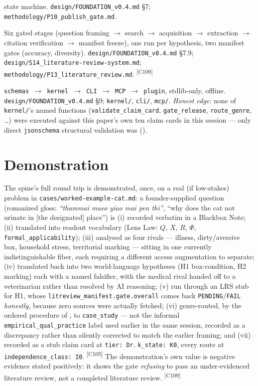 \documentclass[11pt]{article}
\newcommand{\claimref}[1]{\textsuperscript{[#1]}}
\begin{document}
\begin{description}[style=nextline,leftmargin=1.4em,font=\bfseries]
    state machine. \texttt{design/FOUNDATION\_v0.4.md} \S7; \texttt{methodology/P10\_publish\_gate.md}.
  \item[Literature Review System (LRS)] Six gated stages (question framing $\to$ search $\to$
    acquisition $\to$ extraction $\to$ citation verification $\to$ manifest freeze), one run per
    hypothesis, two manifest gates (accuracy, diversity). \texttt{design/FOUNDATION\_v0.4.md}
    \S7.9; \texttt{design/S14\_literature-review-system.md};
    \texttt{methodology/P13\_literature\_review.md}. \claimref{C109}
  \item[Callable layer] \texttt{schemas $\to$ kernel $\to$ CLI $\to$ MCP $\to$ plugin}, stdlib-only,
    offline. \texttt{design/FOUNDATION\_v0.4.md} \S9; \texttt{kernel/}, \texttt{cli/}, \texttt{mcp/}.
    \emph{Honest edge:} none of \texttt{kernel/}'s named functions (\texttt{validate\_claim\_card},
    \texttt{gate\_release}, \texttt{route\_genre}, \dots) were executed against this paper's own
    ten claim cards in this session --- only direct \texttt{jsonschema} structural validation was
    ().
\end{description}

\section{Demonstration}
\label{sec:demonstration}
The spine's full round trip is demonstrated, once, on a real (if low-stakes) problem in
\texttt{cases/worked-example-cat.md}: a founder-supplied question (romanized gloss: \emph{``thammai
maeo yiao mai pen thi''}, ``why does the cat not urinate in [the designated] place'') is (i)
recorded verbatim in a Blackbox Note; (ii) translated into readout vocabulary (Lens Law: $Q$, $X$,
$R$, $\Phi$, \texttt{formal\_applicability}); (iii) analysed as four rivals --- illness,
dirty/aversive box, household stress, territorial marking --- sitting in one currently
indistinguishable fiber, each requiring a different access augmentation to separate; (iv)
translated back into two world-language hypotheses (H1 box-condition, H2 marking) each with a
named falsifier, with the medical rival handed off to a veterinarian rather than resolved by AI
reasoning; (v) run through an LRS stub for H1, whose \texttt{litreview\_manifest.gate.overall}
comes back \texttt{PENDING}/\texttt{FAIL} \emph{honestly}, because zero sources were actually
fetched; (vi) genre-routed, by the ordered procedure of , to \texttt{case\_study}
--- not the informal \texttt{empirical\_qual\_practice} label used earlier in the same session,
recorded as a discrepancy rather than silently corrected to match the earlier framing; and (vii)
recorded as a stub claim card at \texttt{tier: Dr}, \texttt{k\_state: K0}, every route at
\texttt{independence\_class: I0}. \claimref{C105} The demonstration's own value is negative
evidence stated positively: it shows the gate \emph{refusing} to pass an under-evidenced literature
review, not a completed literature review. \claimref{C109}
\end{document}
